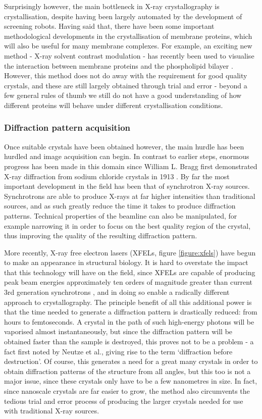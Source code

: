 \documentclass[a4paper,11pt,twoside,openright]{scrbook}
\begin{document}
Surprisingly however, the main bottleneck in X-ray crystallography is
crystallisation, despite having been largely automated by the development of
screening robots. Having said that, there have been some important
methodological developments in the crystallisation of membrane proteins, which
will also be useful for many membrane complexes. For example, an exciting new
method - X-ray solvent contrast modulation - has recently been used to visualise
the interaction between membrane proteins and the phospholipid bilayer
\cite{Norimatsu2017}. However, this method does not do away with the requirement
for good quality crystals, and these are still largely obtained through trial
and error - beyond a few general rules of thumb we still do not have a good
understanding of how different proteins will behave under different
crystallisation conditions.

\subsubsection{Diffraction pattern acquisition}
Once suitable crystals have been obtained however, the main hurdle has been
hurdled and image acquisition can begin. In contrast to earlier steps, enormous
progress has been made in this domain since William L. Bragg first demonstrated
X-ray diffraction from sodium chloride crystals in 1913 \cite{Bragg1913}. By far
the most important development in the field has been that of synchrotron X-ray
sources. Synchrotrons are able to produce X-rays at far higher intensities than
traditional sources, and as such greatly reduce the time it takes to produce
diffraction patterns. Technical properties of the beamline can also be
manipulated, for example narrowing it in order to focus on the best quality
region of the crystal, thus improving the quality of the resulting diffraction
pattern.

More recently, X-ray free electron lasers (XFELs, figure \ref{figure:xfels})
have begun to make an appearance in structural biology. It is hard to overstate
the impact that this technology will have on the field, since XFELs are capable
of producing peak beam energies approximately ten orders of magnitude greater
than current 3rd generation synchrotrons \cite{Shi2014}, and in doing so enable
a radically different approach to crystallography. The principle benefit of all
this additional power is that the time needed to generate a diffraction pattern
is drastically reduced: from hours to femtoseconds. A crystal in the path of
such high-energy photons will be vaporised almost instantaneously, but since the
diffraction pattern will be obtained faster than the sample is destroyed, this
proves not to be a problem - a fact first noted by Neutze et
al.\cite{Neutze2000}, giving rise to the term `diffraction before destruction'.
Of course, this generates a need for a great many crystals in order to obtain
diffraction patterns of the structure from all angles, but this too is not a
major issue, since these crystals only have to be a few nanometres in size. In
fact, since nanoscale crystals are far easier to grow, the method also
circumvents the tedious trial and error process of producing the larger crystals
needed for use with traditional X-ray sources.
\end{document}
